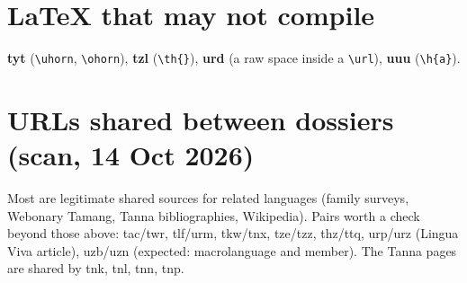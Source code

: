 \documentclass[11pt]{article}
\begin{document}
\section{LaTeX that may not compile}
\textbf{tyt} (\verb|\uhorn|, \verb|\ohorn|), \textbf{tzl} (\verb|\th{}|), \textbf{urd} (a raw space inside a \verb|\url|), \textbf{uuu} (\verb|\h{a}|).

\section{URLs shared between dossiers (scan, 14 Oct 2026)}
Most are legitimate shared sources for related languages (family surveys, Webonary
Tamang, Tanna bibliographies, Wikipedia). Pairs worth a check beyond those above:
tac/twr, tlf/urm, tkw/tnx, tze/tzz, thz/ttq, urp/urz (Lingua Viva article), uzb/uzn
(expected: macrolanguage and member). The Tanna pages are shared by tnk, tnl, tnn, tnp.
\end{document}
